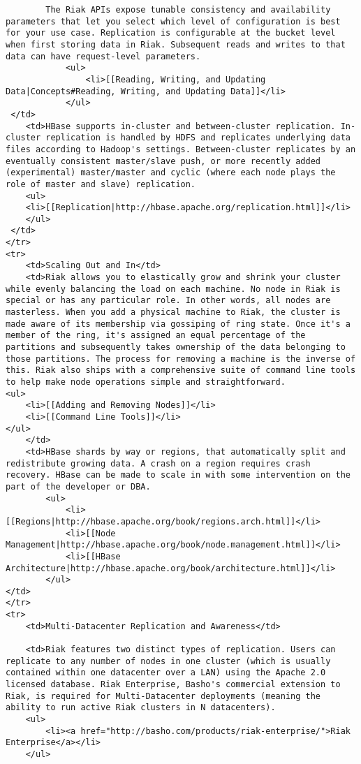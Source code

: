 \documentclass[letter]{book}
\newcounter{tab}[chapter]
\begin{document}
\begin{shaded}
\begin{verbatim}
        The Riak APIs expose tunable consistency and availability parameters that let you select which level of configuration is best for your use case. Replication is configurable at the bucket level when first storing data in Riak. Subsequent reads and writes to that data can have request-level parameters.
            <ul>
                <li>[[Reading, Writing, and Updating Data|Concepts#Reading, Writing, and Updating Data]]</li>
            </ul>
 </td>
    <td>HBase supports in-cluster and between-cluster replication. In-cluster replication is handled by HDFS and replicates underlying data files according to Hadoop's settings. Between-cluster replicates by an eventually consistent master/slave push, or more recently added (experimental) master/master and cyclic (where each node plays the role of master and slave) replication.
    <ul>
    <li>[[Replication|http://hbase.apache.org/replication.html]]</li>
    </ul>
 </td>
</tr>
<tr>
    <td>Scaling Out and In</td>
    <td>Riak allows you to elastically grow and shrink your cluster while evenly balancing the load on each machine. No node in Riak is special or has any particular role. In other words, all nodes are masterless. When you add a physical machine to Riak, the cluster is made aware of its membership via gossiping of ring state. Once it's a member of the ring, it's assigned an equal percentage of the partitions and subsequently takes ownership of the data belonging to those partitions. The process for removing a machine is the inverse of this. Riak also ships with a comprehensive suite of command line tools to help make node operations simple and straightforward.
<ul>
    <li>[[Adding and Removing Nodes]]</li>
    <li>[[Command Line Tools]]</li>
</ul>
    </td>
    <td>HBase shards by way or regions, that automatically split and redistribute growing data. A crash on a region requires crash recovery. HBase can be made to scale in with some intervention on the part of the developer or DBA.
        <ul>
            <li>[[Regions|http://hbase.apache.org/book/regions.arch.html]]</li>
            <li>[[Node Management|http://hbase.apache.org/book/node.management.html]]</li>
            <li>[[HBase Architecture|http://hbase.apache.org/book/architecture.html]]</li>
        </ul>
</td>
</tr>
<tr>
    <td>Multi-Datacenter Replication and Awareness</td>

    <td>Riak features two distinct types of replication. Users can replicate to any number of nodes in one cluster (which is usually contained within one datacenter over a LAN) using the Apache 2.0 licensed database. Riak Enterprise, Basho's commercial extension to Riak, is required for Multi-Datacenter deployments (meaning the ability to run active Riak clusters in N datacenters).
    <ul>
        <li><a href="http://basho.com/products/riak-enterprise/">Riak Enterprise</a></li>
    </ul>


\end{verbatim}
\end{shaded}
\end{document}
